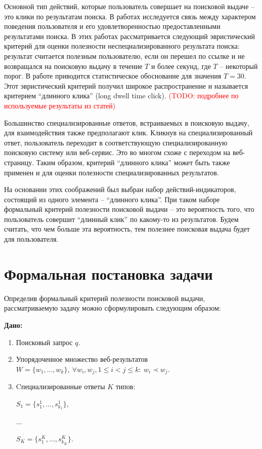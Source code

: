 \documentclass[12pt,a4paper]{report}
\newcommand\note[1]{\textcolor{red}{(#1)}}
\newcommand\todonote[1]{\note{TODO: #1}}
\begin{document}
Основной тип действий, которые пользователь совершает на поисковой выдаче -- это клики по результатам поиска. В работах \cite{Joachims, Fox-LDTClick, White, Kim} исследуется связь между характером поведения пользователя и его удовлетворенностью предоставленными результатами поиска. В этих работах рассматривается следующий эвристический критерий для оценки полезности неспециализированного результата поиска: результат считается полезным пользователю, если он перешел по ссылке и не возвращался на поисковую выдачу в течение $T$ и более секунд, где $T$ -- некоторый порог. В работе \cite{Fox-LDTClick} приводится статистическое обоснование для значения $T=30$. Этот эвристический критерий получил широкое распространение \cite{White, Kim} и называется критерием ``длинного клика'' (long dwell time click). \todonote{подробнее по используемые результаты из статей}

Большинство специализированные ответов, встраиваемых в поисковую выдачу, для взаимодействия также предполагают клик. Кликнув на специализированный ответ, пользователь переходит в соответствующую специализированную поисковую систему или веб-сервис. Это во многом схоже с переходом на веб-страницу. Таким образом, критерий ``длинного клика'' может быть также применен и для оценки полезности специализированных результатов.

На основании этих соображений был выбран набор действий-индикаторов, состоящий из одного элемента -- ``длинного клика''. При таком наборе формальный критерий полезности поисковой выдачи -- это вероятность того, что пользователь совершит ``длинный клик'' по какому-то из результатов. Будем считать, что чем больше эта вероятность, тем полезнее поисковая выдача будет для пользователя. 

\section{Формальная постановка задачи}

Определив формальный критерий полезности поисковой выдачи, рассматриваемую задачу можно сформулировать следующим образом:
\vspace{3mm}

\textbf{Дано:} 
\begin{enumerate}
\item Поисковый запрос $q$. 
\item Упорядоченное множество веб-результатов $W=\{w_1, ..., w_k\}, \ \forall w_i, w_j, 1 \le i < j \le k: \ w_i \prec w_j$.
\item Cпециализированные ответы $K$ типов: \par
$S_1=\{s^{1}_{1}, ..., s^{1}_{k_1}\},$ \par
$...$ \par
$S_K=\{s^{K}_{1}, ..., s^{K}_{k_K}\}$.
\end{enumerate}
\end{document}
